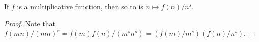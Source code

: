 \begin{theorem}
\label{LSeries.term_isMultiplicative_if_fun_isMultiplicative}
\leanok
If $f$ is a multiplicative function, then so to is $n\mapsto f(n)/n^s$.
\end{theorem}
\begin{proof}
\leanok
Note that $f(mn)/(mn)^s=f(m)f(n)/(m^sn^s)=(f(m)/m^s)(f(n)/n^s)$.
\end{proof}
